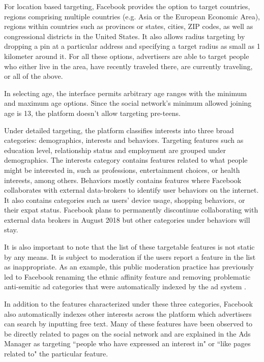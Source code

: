 For location based targeting, Facebook provides the option to target countries, regions comprising multiple countries (e.g. Asia or the European Economic Area), regions within countries such as provinces or states, cities, ZIP codes, as well as congressional districts in the United States. It also allows radius targeting by dropping a pin at a particular address and specifying a target radius as small as 1 kilometer around it. For all these options, advertisers are able to target people who either live in the area, have recently traveled there, are currently traveling, or all of the above.

In selecting age, the interface permits arbitrary age ranges with the minimum and maximum age options. Since the social network's minimum allowed joining age is 13, the platform doesn't allow targeting pre-teens.

Under detailed targeting, the platform classifies interests into three broad categories: demographics, interests and behaviors. Targeting features such as education level, relationship status and employment are grouped under demographics. The interests category contains features related to what people might be interested in, such as professions, entertainment choices, or health interests, among others. Behaviors mostly contains features where Facebook collaborates with external data-brokers to identify user behaviors on the internet. It also contains categories such as users' device usage, shopping behaviors, or their expat status. Facebook plans to permanently discontinue collaborating with external data brokers in August 2018 but other categories under behaviors will stay.

It is also important to note that the list of these targetable features is not static by any means. It is subject to moderation if the users report a feature in the list as inappropriate. As an example, this public moderation practice has previously led to Facebook renaming the ethnic affinity feature \cite{propublica_fb_ethnic_affinity_again} and removing problematic anti-semitic ad categories that were automatically indexed by the ad system \cite{propublica_jew_hater_study}.


In addition to the features characterized under these three categories, Facebook also automatically indexes other interests across the platform which advertisers can search by inputting free text. Many of these features have been observed to be directly related to pages on the social network and are explained in the Ads Manager as targeting ``people who have expressed an interest in" or ``like pages related to" the particular feature.

